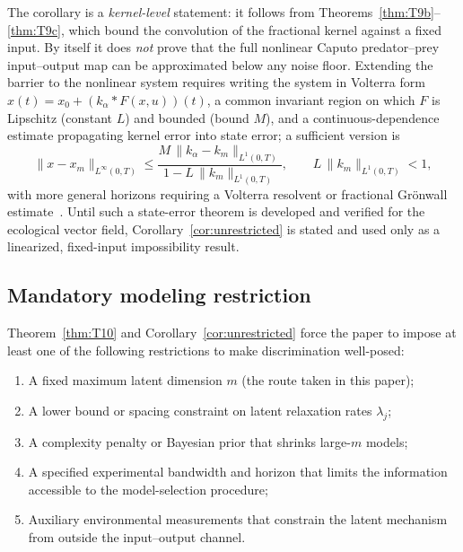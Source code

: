 \begin{remark}
\label{rem:nfl_scope}
The corollary is a \emph{kernel-level} statement: it follows from Theorems~\ref{thm:T9b}--\ref{thm:T9c}, which bound the convolution of the fractional kernel against a fixed input. By itself it does \emph{not} prove that the full nonlinear Caputo predator--prey input--output map can be approximated below any noise floor. Extending the barrier to the nonlinear system requires writing the system in Volterra form $x(t) = x_0 + (k_\alpha * F(x,u))(t)$, a common invariant region on which $F$ is Lipschitz (constant $L$) and bounded (bound $M$), and a continuous-dependence estimate propagating kernel error into state error; a sufficient version is
\[
\|x - x_m\|_{L^\infty(0,T)}
\le
\frac{M\,\|k_\alpha - k_m\|_{L^1(0,T)}}{1 - L\,\|k_m\|_{L^1(0,T)}},
\qquad L\,\|k_m\|_{L^1(0,T)} < 1,
\]
with more general horizons requiring a Volterra resolvent or fractional Gr\"onwall estimate~\cite{F11}. Until such a state-error theorem is developed and verified for the ecological vector field, Corollary~\ref{cor:unrestricted} is stated and used only as a linearized, fixed-input impossibility result.
\end{remark}

\subsection{Mandatory modeling restriction}

Theorem~\ref{thm:T10} and Corollary~\ref{cor:unrestricted} force the paper to impose at least one of the following restrictions to make discrimination well-posed:

\begin{enumerate}
    \item A fixed maximum latent dimension \(m\) (the route taken in this paper);
    \item A lower bound or spacing constraint on latent relaxation rates \(\lambda_j\);
    \item A complexity penalty or Bayesian prior that shrinks large-\(m\) models;
    \item A specified experimental bandwidth and horizon that limits the information accessible to the model-selection procedure;
    \item Auxiliary environmental measurements that constrain the latent mechanism from outside the input--output channel.
\end{enumerate}

